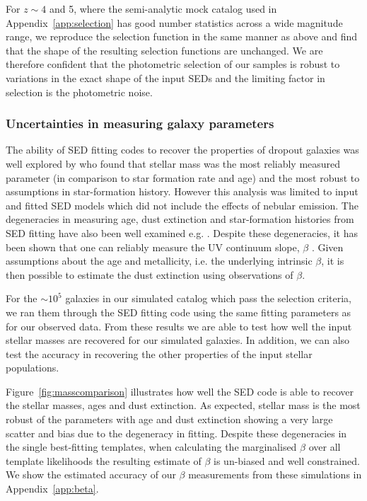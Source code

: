 For $z\sim 4$ and 5, where the semi-analytic mock catalog used in Appendix~\ref{app:selection} has good number statistics across a wide magnitude range, we reproduce the selection function in the same manner as above and find that the shape of the resulting selection functions are unchanged. We are therefore confident that the photometric selection of our samples is robust to variations in the exact shape of the input SEDs and the limiting factor in selection is the photometric noise.

\subsubsection{Uncertainties in measuring galaxy parameters}
The ability of SED fitting codes to recover the properties of dropout galaxies was well explored by \citet{2010ApJ...725.1644L} who found that stellar mass was the most reliably measured parameter (in comparison to star formation rate and age) and the most robust to assumptions in star-formation history. However this analysis was limited to input and fitted SED models which did not include the effects of nebular emission. The degeneracies in measuring age, dust extinction and star-formation histories from SED fitting have also been well examined e.g. \citet{2010A&A...515A..73S}. Despite these degeneracies, it has been shown that one can reliably measure the UV continuum slope, $\beta$ \citep{2012ApJ...756..164F,2013MNRAS.429.2456R}. Given assumptions about the age and metallicity, i.e. the underlying intrinsic $\beta$, it is then possible to estimate the dust extinction using observations of $\beta$.

For the $\sim 10^5$ galaxies in our simulated catalog which pass the selection criteria, we ran them through the SED fitting code using the same fitting parameters as for our observed data. From these results we are able to test how well the input stellar masses are recovered for our simulated galaxies. In addition, we can also test the accuracy in recovering the other properties of the input stellar populations.

Figure~\ref{fig:masscomparison} illustrates how well the SED code is able to recover the stellar masses, ages and dust extinction. As expected, stellar mass is the most robust of the parameters with age and dust extinction showing a very large scatter and bias due to the degeneracy in fitting. Despite these degeneracies in the single best-fitting templates, when calculating the marginalised $\beta$ over all template likelihoods the resulting estimate of $\beta$ is un-biased and well constrained. We show the estimated accuracy of our $\beta$ measurements from these simulations in Appendix~\ref{app:beta}.

